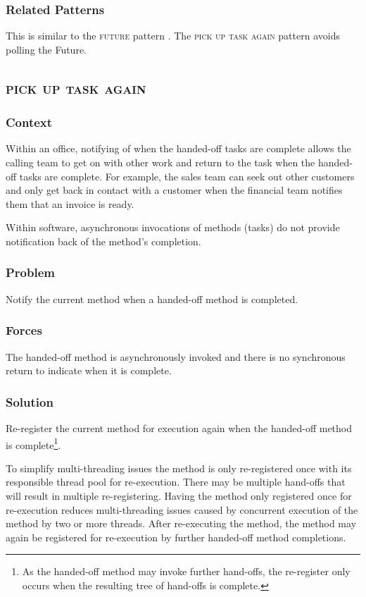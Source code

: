 \documentclass[prodmode]{style/acmlarge}
\begin{document}
\subsubsection*{Related Patterns} This is similar to the \textsc{future} pattern
\cite{concurrent-java}.  The \textsc{pick up task again} pattern avoids polling
the Future.



\subsection{\textsc{\textbf{pick up task again}}}

\subsubsection*{Context} Within an office, notifying of when the handed-off tasks
are complete allows the calling team to get on with other work and return to the
task when the handed-off tasks are complete.  For example, the sales team can
seek out other customers and only get back in contact with a customer when the
financial team notifies them that an invoice is ready.

Within software, asynchronous invocations of methods (tasks) do not provide
notification back of the method's completion.

\subsubsection*{\textbf{Problem}} Notify the current method when a handed-off method is
completed.

\subsubsection*{Forces} The handed-off method is asynchronously invoked and there is
no synchronous return to indicate when it is complete.

\subsubsection*{\textbf{Solution}} Re-register the current method for execution again
when the handed-off method is complete\footnote{As the handed-off method may
invoke further hand-offs, the re-register only occurs when the resulting tree of
hand-offs is complete.}.

To simplify multi-threading issues the method is only re-registered once with
its responsible thread pool for re-execution.  There may be multiple hand-offs
that will result in multiple re-registering.  Having the method only registered
once for re-execution reduces multi-threading issues caused by concurrent
execution of the method by two or more threads.  After re-executing the method,
the method may again be registered for re-execution by further handed-off method
completions.
\end{document}
